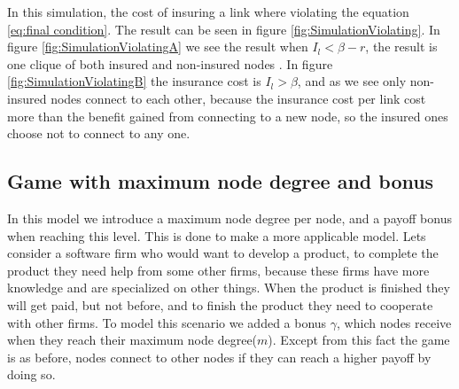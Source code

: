 In this simulation, the cost of insuring a link where violating the equation \ref{eq:final condition}. The result can be seen in figure \ref{fig:SimulationViolating}.  In figure \ref{fig:SimulationViolatingA} we see the result when $I_{l}<\beta-r$, the result is one clique of both insured and non-insured nodes . In figure \ref{fig:SimulationViolatingB} the insurance cost is $I_{l}>\beta$, and as we see only non-insured nodes connect to each other, because the insurance cost per link cost more than the benefit gained from connecting to a new node, so the insured ones choose not to connect to any one. 

\subsection{Game with maximum node degree and bonus}
In this model we introduce a maximum node degree per node, and a payoff bonus when reaching this level. This is done to make a more applicable model. Lets consider a software firm who would want to develop a product, to complete the product they need help from some other firms, because these firms have more knowledge and are specialized on other things. When the product is finished they will get paid, but not before, and to finish the product they need to cooperate with other firms.
To model this scenario we added a bonus $\gamma$, which nodes receive when they reach their maximum node degree($m$). Except from this fact the game is as before, nodes connect to other nodes if they can reach a higher payoff by doing so.
